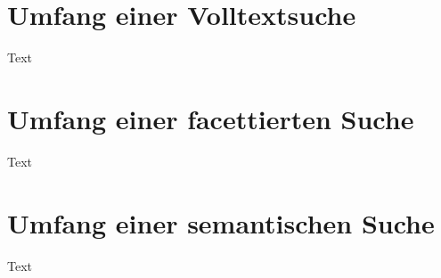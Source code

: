 \section{Umfang einer Volltextsuche\label{sec3.2:Unterunterpunkt-2}}

Text


\section{Umfang einer facettierten Suche\label{sec3.3:Unterpunkt-3}}

Text

% 

\section{Umfang einer semantischen Suche\label{sec3.4:Unterpunkt-4}}

Text

% 